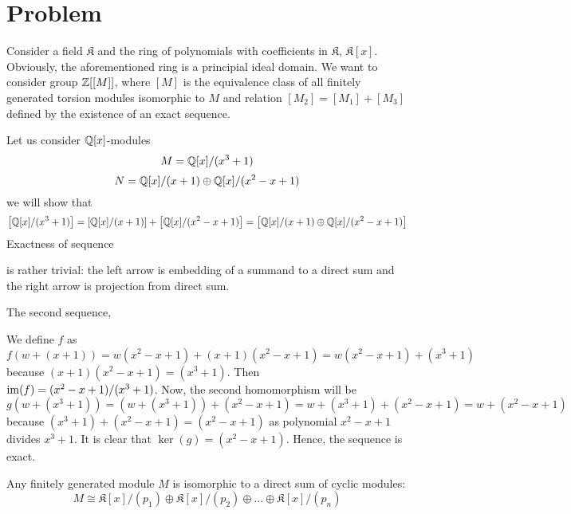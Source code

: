 \section{Problem}

Consider a field $\mathfrak{K}$ and the ring of polynomials with coefficients in $\mathfrak{K}$, $\mathfrak{K}[x]$. Obviously, the aforementioned ring is a principial ideal domain. We want to consider group $\operatorname{\mathbb{Z}}[[M]]$, where $[M]$ is the equivalence class of all finitely generated torsion modules isomorphic to $M$ and relation $[M_2]=[M_1]+[M_3]$ defined by the existence of an exact sequence.

\begin{example}\color{red}
  Let us consider $\operatorname{\mathbb{Q}}[x]$-modules
  $$M={\operatorname{\mathbb{Q}}[x]}/{(x^3+1)}$$
  $$N={\operatorname{\mathbb{Q}}[x]}/{(x+1)}\oplus{\operatorname{\mathbb{Q}}[x]}/{(x^2-x+1)}$$
  we will show that
  $$\left[{\operatorname{\mathbb{Q}}[x]}/{(x^3+1)}\right]=\left[{\operatorname{\mathbb{Q}}[x]}/{(x+1)}\right]+\left[{\operatorname{\mathbb{Q}}[x]}/{(x^2-x+1)}\right]=\left[{\operatorname{\mathbb{Q}}[x]}/{(x+1)}\oplus{\operatorname{\mathbb{Q}}[x]}/{(x^2-x+1)}\right]$$
  Exactness of sequence
  \begin{center}\end{center}
  is rather trivial: the left arrow is embedding of a summand to a direct sum and the right arrow is projection from direct sum.

  The second sequence,
  \begin{center}\end{center}
  We define $f$ as 
  $$f(w+(x+1))=w(x^2-x+1)+(x+1)(x^2-x+1)=w(x^2-x+1)+(x^3+1)$$
  because $(x+1)(x^2-x+1)=(x^3+1)$. Then $\operatorname{im}(f)=(x^2-x+1)/(x^3+1)$. Now, the second homomorphism will be 
  $$g(w+(x^3+1))=(w+(x^3+1))+(x^2-x+1)=w+(x^3+1)+(x^2-x+1)=w+(x^2-x+1)$$
  because $(x^3+1)+(x^2-x+1)=(x^2-x+1)$ as polynomial $x^2-x+1$ divides $x^3+1$. It is clear that $\ker(g)=(x^2-x+1)$. Hence, the sequence is exact.
\end{example}

Any finitely generated module $M$ is isomorphic to a direct sum of cyclic modules:
$$M\cong \mathfrak{K}[x]/(p_1)\oplus \mathfrak{K}[x]/(p_2)\oplus...\oplus \mathfrak{K}[x]/(p_n)$$

